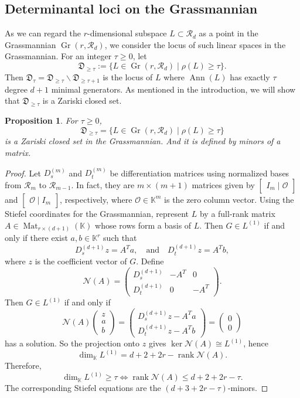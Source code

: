 \documentclass[a4paper, 11pt]{amsart}
\numberwithin{theorem}{section}
\newtheorem{proposition}[theorem]{Proposition}
\theoremstyle{definition}
\numberwithin{equation}{section}
\DeclareMathOperator{\Ann}{\operatorname{Ann}}
\newcommand{\cR}{\mathcal R}
\newcommand{\Gr}{\operatorname{Gr}}
\newcommand{\rank}{\operatorname{rank}}
\begin{document}
\subsection{Determinantal loci on the Grassmannian}\label{subsec:Antiderivatives}
As we can regard the $r$-dimensional subspace $L\subset \mathcal{R}_d$ as a point in the Grassmannian $\Gr(r,\mathcal{R}_d)$, we consider the locus of such linear spaces in the Grassmannian.
For an integer $\tau\ge0$, let
\[
\mathfrak D_{\ge\tau}
:=\{L\in\Gr(r,\cR_d)\mid\rho(L)\ge\tau\}.
\]
Then $\mathfrak{D}_\tau=\mathfrak{D}_{\ge\tau}\backslash \mathfrak{D}_{\ge\tau+1}$ is the locus of $L$ where $\Ann(L)$ has exactly $\tau$ degree $d+1$ minimal generators. 
As mentioned in the introduction, we will show that $\mathfrak{D}_{\geq \tau}$ is a Zariski closed set.

\begin{proposition}\label{prop:apolarDefectLocus}
For $\tau\geq 0$, 
\[
\mathfrak D_{\ge\tau} = \{L\in\Gr(r,\cR_d)\mid\rho(L)\ge\tau\}
\]
is a Zariski closed set in the Grassmannian. 
And it is defined by minors of a matrix.
\end{proposition}
\begin{proof}
Let $D_s^{(m)}$ and $D_t^{(m)}$ be differentiation matrices using normalized bases from $\cR_m$ to $\cR_{m-1}$. 
In fact, they are $m\times (m+1)$ matrices given by $\begin{bmatrix} I_{m} \mid \mathcal{O} \end{bmatrix}$ and $\begin{bmatrix} \mathcal{O} \mid I_{m} \end{bmatrix}$, respectively, where $\mathcal{O} \in \mathbb{K}^{m}$ is the zero column vector.
Using the Stiefel coordinates for the Grassmannian, represent $L$ by a full-rank matrix $A\in\operatorname{Mat}_{r\times(d+1)}(\mathbb{K})$ whose rows form a basis of $L$. 
Then $G\in L^{(1)}$ if and only if there exist $a,b\in \mathbb{K}^r$ such that
\[
D_s^{(d+1)}z=A^Ta, \quad \text{and} \quad D_t^{(d+1)}z=A^Tb,
\]
where $z$ is the coefficient vector of $G$. 
Define
\[
\mathcal N(A)=
\begin{pmatrix}
D_s^{(d+1)}&-A^T&0\\
D_t^{(d+1)}&0&-A^T
\end{pmatrix}.
\]
Then $G\in L^{(1)}$ if and only if \[\mathcal{N}(A)\begin{pmatrix} z\\a\\b\end{pmatrix}=\begin{pmatrix}D_s^{(d+1)}z-A^Ta\\D_t^{(d+1)}z-A^Tb\end{pmatrix}=\begin{pmatrix}0\\0\end{pmatrix}\] has a solution. 
So the projection onto $z$ gives $\ker\mathcal N(A)\cong L^{(1)}$, hence
\[
\dim_{\mathbb{K}} L^{(1)}=d+2+2r-\rank\mathcal N(A).
\]
Therefore,
\[
\dim_{\mathbb{K}} L^{(1)}\ge\tau \iff \rank\mathcal N(A)\le d+2+2r-\tau.
\]
The corresponding Stiefel equations are the $(d+3+2r-\tau)$-minors.
\end{proof}
\end{document}
